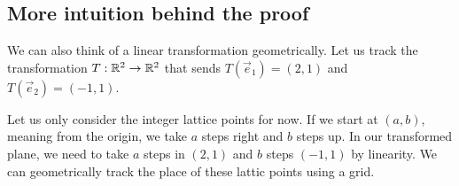 \subsection*{More intuition behind the proof}
We can also think of a linear transformation geometrically.
Let us track the transformation $T:\mathbb{R}^2\to\mathbb{R}^2$ that sends $T(\vec{e}_1)= (2,1)$ and $T(\vec{e}_2)=(-1,1)$.
\begin{figure}[h]
	\centering
	\begin{subfigure}[l]{0.15\textwidth}
	\end{subfigure}
	\centering
	\begin{subfigure}{0.3\textwidth}
	\end{subfigure}
	\begin{subfigure}[r]{0.4\textwidth}
	\end{subfigure}
\end{figure}
Let us only consider the integer lattice points for now. If we start at $(a,b)$, meaning from the origin, we take $a$ steps right and $b$ steps up. In our transformed plane, we need to take $a$ steps in $(2,1)$ and $b$ steps $(-1,1)$ by linearity. We can geometrically track the place of these lattic points using a grid.
